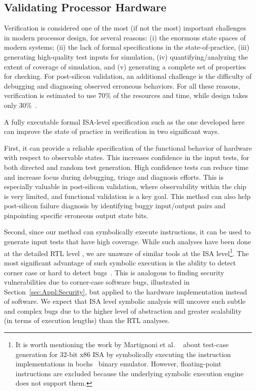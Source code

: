 \subsection{Validating Processor Hardware}
\label{sec:Appl:Processor}

Verification is considered one of the most (if not the most) important 
challenges in modern processor design, for several reasons: 
(i) the enormous state spaces of modern systems; 
(ii) the lack of formal specifications in the state-of-practice, 
(iii) generating high-quality test inputs for simulation, 
(iv) quantifying/analyzing the extent of coverage of simulation, and 
(v) generating a complete set of properties for checking. 
For post-silicon validation, an additional challenge is the difficulty 
of debugging and diagnosing observed erroneous behaviors. 
For all these reasons, verification is estimated to use 70\% of the 
resources and time, while design takes only 30\%~\cite{Foster:DAC2015}.

A fully executable formal ISA-level specification such as the one developed here can improve the state of practice in verification in two significant ways. 

First, it can provide a reliable specification of the functional behavior of 
hardware with respect to observable states. This increases 
confidence in the input tests, for both directed and random test generation. 
High confidence tests can reduce time and increase focus during debugging, 
triage and diagnosis efforts. This is especially valuable in post-silicon 
validation, where observability within the chip is very limited, and functional 
validation is a key goal. This method can also help post-silicon failure 
diagnosis by identifying buggy input/output pairs and pinpointing specific 
erroneous output state bits.

Second, since our method can symbolically execute instructions, it can be used 
to generate input tests that have high coverage. While such analyses have been 
done at the detailed RTL level \cite{liu2014, liu2011, mishra18}, we are 
unaware of similar tools at the \ISA ISA level\footnote{It is worth mentioning the work by Martignoni et al. ~\cite{Martignoni:ASPLOS2012} about test-case generation for $32$-bit x86 ISA by symbolically executing the instruction implementations in bochs~\cite{Bochs1996} binary emulator. However, floating-point instructions are excluded because the underlying symbolic execution engine does not support them.}. The most significant advantage of 
such symbolic execution is the ability to detect corner case or hard to detect 
bugs~\cite{liu2014,Fonseca:Eurosys2017}. This is analogous to finding security vulnerabilities 
due to corner-case software bugs, illustrated in 
Section~\ref{sec:Appl:Security}, but applied to the hardware implementation instead of software. We expect that ISA level symbolic analysis will 
uncover such subtle and complex bugs due to the higher level of abstraction 
and greater scalability (in terms of execution lengths) than the RTL analyses.

